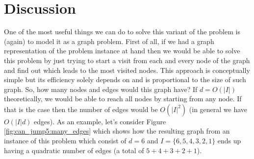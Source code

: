\section{Discussion}
\label{can_jump5:sec:discussion}
One of the most useful things we can do to solve this variant of the  problem is (again) to model it as a graph problem.
First of all, if we had a graph representation of the problem instance at hand then we would be able to solve this problem by just trying to start a visit from each and every node of the graph and find out which leads to the most visited nodes. This approach is conceptually simple but its efficiency solely depends on and is proportional to the size of such graph.
So, how many nodes and edges would this graph have? If $d = O(|I|)$ theoretically, we would be able to reach all nodes by starting from any node.
If that is the case then the number of edges would be $O(|I|^2)$ (in general we have $O(|I|d)$ edges).
As an example, let's consider Figure \ref{fig:can_jump5:many_edges} which shows how the resulting graph from an instance of this problem which consist of $d=6$ and $I=\{6,5,4,3,2,1\}$ ends up having a quadratic number of edges (a total of $5+4+3+2+1$).

